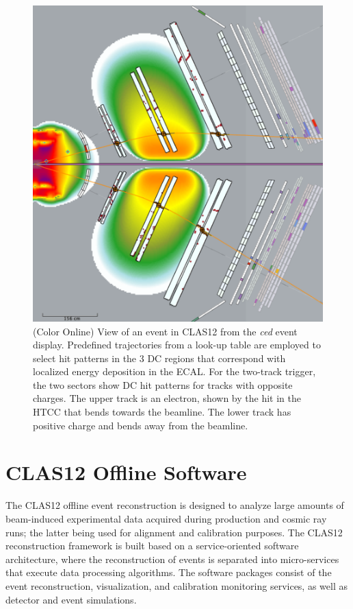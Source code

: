 \documentclass[final,3p,twocolumn]{elsarticle}
\begin{document}
\begin{figure}[th!]
\centerline{\includegraphics[width=0.95\columnwidth]{trigger.png}}
\caption{(Color Online) View of an event in CLAS12 from the {\it ced} event display. Predefined trajectories from a look-up
  table are employed to select hit patterns in the 3 DC regions that correspond with localized energy deposition
  in the ECAL. For the two-track trigger, the two sectors show DC hit patterns for tracks with opposite charges.
  The upper track is an electron, shown by the hit in the HTCC that bends towards the beamline. The lower track
  has positive charge and bends away from the beamline.}
\label{trigger}
\end{figure}

\section{CLAS12 Offline Software}  

The CLAS12 offline event reconstruction is designed to analyze large amounts of beam-induced experimental data
acquired during production and cosmic ray runs; the latter being used for alignment and calibration purposes. The
CLAS12 reconstruction framework is built based on a service-oriented software architecture, where the
reconstruction of events is separated into micro-services that execute data processing algorithms. The software
packages consist of the event reconstruction, visualization, and calibration monitoring services, as well as detector
and event simulations. 
\end{document}

